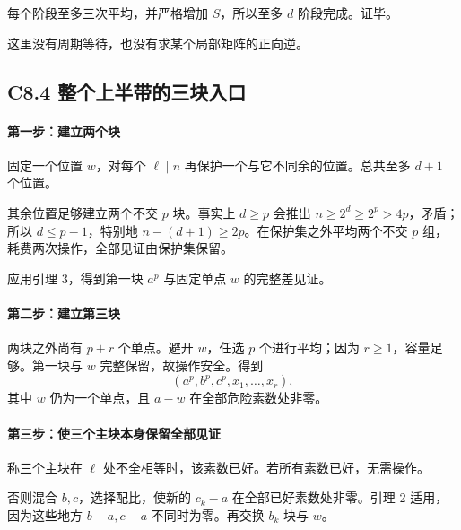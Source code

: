 \documentclass[11pt,a4paper]{article}
\theoremstyle{definition}
\numberwithin{equation}{section}
\begin{document}
{每个阶段至多三次平均，并严格增加} \(S\){，所以至多} \(d\) {阶段完成。证毕。}

{这里没有周期等待，也没有求某个局部矩阵的正向逆。}

\subsection*{\texorpdfstring{{C8.4} {整个上半带的三块入口}}{C8.4 整个上半带的三块入口}}\label{C8-h51}

\paragraph*{\texorpdfstring{{第一步：建立两个块}}{第一步：建立两个块}}\label{C8-h52}

{固定一个位置} \(w\){，对每个} \(\ell\mid n\) {再保护一个与它不同余的位置。总共至多} \(d+1\) {个位置。}

{其余位置足够建立两个不交} \(p\) {块。事实上} \(d\ge p\) {会推出} \(n\ge2^d\ge2^p>4p\){，矛盾；所以} \(d\le p-1\){，特别地} \(n-(d+1)\ge2p\){。在保护集之外平均两个不交} \(p\) {组，耗费两次操作，全部见证由保护集保留。}

{应用引理} {3，得到第一块} \(a^p\) {与固定单点} \(w\) {的完整差见证。}

\paragraph*{\texorpdfstring{{第二步：建立第三块}}{第二步：建立第三块}}\label{C8-h53}

{两块之外尚有} \(p+r\) {个单点。避开} \(w\){，任选} \(p\) {个进行平均；因为} \(r\ge1\){，容量足够。第一块与} \(w\) {完整保留，故操作安全。得到} \[
(a^p,b^p,c^p,x_1,\ldots,x_r),
\tag{C8.7}
\] {其中} \(w\) {仍为一个单点，且} \(a-w\) {在全部危险素数处非零。}

\paragraph*{\texorpdfstring{{第三步：使三个主块本身保留全部见证}}{第三步：使三个主块本身保留全部见证}}\label{C8-h54}

{称三个主块在} \(\ell\) {处不全相等时，该素数已好。若所有素数已好，无需操作。}

{否则混合} \(b,c\){，选择配比，使新的} \(c_k-a\) {在全部已好素数处非零。引理} {2} {适用，因为这些地方} \(b-a,c-a\) {不同时为零。再交换} \(b_k\) {块与} \(w\){。}
\end{document}
